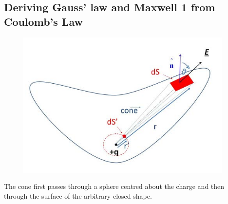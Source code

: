 \documentclass[a4paper, 11pt, normalem]{report}
\begin{document}
\subsection{Deriving Gauss' law and Maxwell 1 from Coulomb's Law}
\begin{figure}
    \begin{center}
        \includegraphics[scale=0.4]{fluxvec.png}
    \end{center}
\end{figure}
The cone first passes through a sphere centred about the charge and then through the surface of the arbitrary closed shape.
\end{document}
